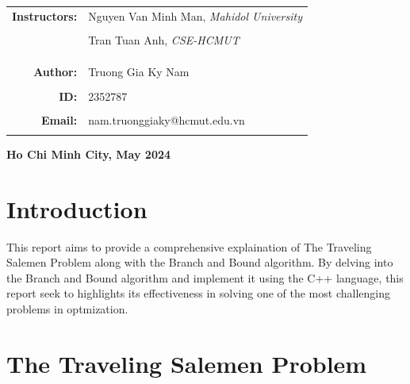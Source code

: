 \documentclass[a4paper]{article}
\begin{document}
\begin{titlepage}
\begin{center}
\begin{tabular}{ccc}
    \multicolumn{1}{r}{\textbf{\Large Instructors:}} & \multicolumn{2}{l}{\Large Nguyen Van Minh Man, \textit{Mahidol University}} \\ \\
    \multicolumn{1}{r}{} & \multicolumn{2}{l}{\Large Tran Tuan Anh, \textit{CSE-HCMUT}} \\ \\

    \\ \\

    \multicolumn{1}{r}{\Large \textbf{Author:}} & \multicolumn{2}{l}{\Large Truong Gia Ky Nam} \\ \\

    \multicolumn{1}{r}{\Large \textbf{ID:}} & \multicolumn{2}{l}{\Large 2352787} \\ \\

    \multicolumn{1}{r}{\Large \textbf{Email:}} & \multicolumn{2}{l}{\Large nam.truonggiaky@hcmut.edu.vn} \\ \\
\end{tabular}
\end{center}

\vspace{4cm}

\begin{center}
{\textbf{\Large Ho Chi Minh City, May 2024}}
\end{center}
\end{titlepage}

\thispagestyle{empty}
\setcounter{page}{-1}
\newpage
\begin{abstract}
    \noindent 
\end{abstract}
\newpage

\setcounter{page}{0}
\thispagestyle{empty}
\newpage
\tableofcontents
\newpage

\section{Introduction}
This report aims to provide a comprehensive explaination of The Traveling Salemen Problem along with the Branch and Bound algorithm. By delving into the Branch and Bound algorithm and implement it using the C++ language, this report seek to highlights its effectiveness in solving one of the most challenging problems in optmization. 
\section{The Traveling Salemen Problem}
\end{document}
